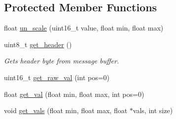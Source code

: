 \subsection*{Protected Member Functions}
\begin{DoxyCompactItemize}
\item 
float \hyperlink{classReceiver_a5fa8d82ac04bd42f7f314aa61c8b3725}{un\+\_\+scale} (uint16\+\_\+t value, float min, float max)
\item 
uint8\+\_\+t \hyperlink{classReceiver_a480c99fb1f3107075a36672376d50dc5}{get\+\_\+header} ()\hypertarget{classReceiver_a480c99fb1f3107075a36672376d50dc5}{}\label{classReceiver_a480c99fb1f3107075a36672376d50dc5}

\begin{DoxyCompactList}\small\item\em Gets header byte from message buffer. \end{DoxyCompactList}\item 
uint16\+\_\+t \hyperlink{classReceiver_a439f7ad261ad2843877397fc5c795122}{get\+\_\+raw\+\_\+val} (int pos=0)
\item 
float \hyperlink{classReceiver_a9394a5ca927e9fffabe945efb0db0e2b}{get\+\_\+val} (float min, float max, int pos=0)
\item 
void \hyperlink{classReceiver_a675c33582709485763bb734673bb43b1}{get\+\_\+vals} (float min, float max, float $\ast$vals, int size)
\end{DoxyCompactItemize}

